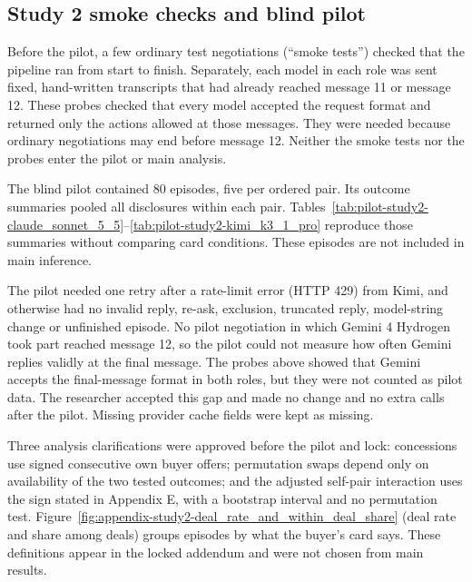 \subsection{Study 2 smoke checks and blind pilot}
\label{subapp:study-2-smoke-checks-and-blind-pilot}
Before the pilot, a few ordinary test negotiations (``smoke tests'') checked that the pipeline ran from start to finish. Separately, each model in each role was sent fixed, hand-written transcripts that had already reached message 11 or message 12. These probes checked that every model accepted the request format and returned only the actions allowed at those messages. They were needed because ordinary negotiations may end before message 12. Neither the smoke tests nor the probes enter the pilot or main analysis.

The blind pilot contained 80 episodes, five per ordered pair. Its outcome summaries pooled all disclosures within each pair. Tables~\ref{tab:pilot-study2-claude_sonnet_5_5}--\ref{tab:pilot-study2-kimi_k3_1_pro} reproduce those summaries without comparing card conditions. These episodes are not included in main inference.


The pilot needed one retry after a rate-limit error (HTTP 429) from Kimi, and otherwise had no invalid reply, re-ask, exclusion, truncated reply, model-string change or unfinished episode. No pilot negotiation in which Gemini 4 Hydrogen took part reached message 12, so the pilot could not measure how often Gemini replies validly at the final message. The probes above showed that Gemini accepts the final-message format in both roles, but they were not counted as pilot data. The researcher accepted this gap and made no change and no extra calls after the pilot. Missing provider cache fields were kept as missing.

Three analysis clarifications were approved before the pilot and lock: concessions use signed consecutive own buyer offers; permutation swaps depend only on availability of the two tested outcomes; and the adjusted self-pair interaction uses the sign stated in Appendix E, with a bootstrap interval and no permutation test. Figure~\ref{fig:appendix-study2-deal_rate_and_within_deal_share} (deal rate and share among deals) groups episodes by what the buyer's card says. These definitions appear in the locked addendum and were not chosen from main results.

